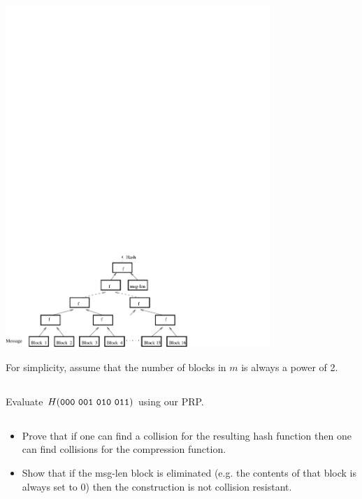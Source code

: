\documentclass[12pt]{article}
\begin{document}
\begin{center}
\includegraphics[width=10cm]{img/hash-tree.pdf}
\end{center}

For simplicity, assume that the number of blocks in $m$ is always a power of 2.

\subsection{}

Evaluate $H({\tt 000~001~010~011})$ using our PRP.



\subsection{}

\begin{itemize}
\item Prove that if one can find a collision for the resulting hash function then one can
find collisions for the compression function.
\item Show that if the msg-len block is eliminated (e.g. the contents of that block is always set to 0) then the construction is not collision resistant.
\end{itemize}
\end{document}
